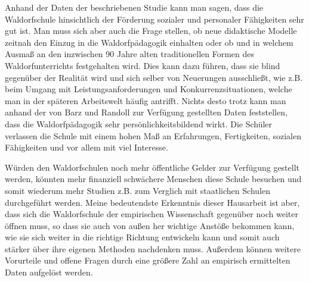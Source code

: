 Anhand der Daten der beschriebenen Studie kann man sagen, dass die Waldorfschule hinsichtlich der Förderung sozialer und personaler Fähigkeiten sehr gut ist. Man muss sich aber auch die Frage stellen, ob neue didaktische Modelle zeitnah den Einzug in die Waldorfpädagogik einhalten oder ob und in welchem Ausmaß an den inzwischen 90 Jahre alten traditionellen Formen des Waldorfunterrichts festgehalten wird. Dies kann dazu führen, dass sie blind gegenüber der Realität wird und sich selber von Neuerungen ausschließt, wie z.B. beim Umgang mit Leistungsanforderungen und Konkurrenzsituationen, welche man in der späteren Arbeitswelt häufig antrifft. Nichts desto trotz kann man anhand der von Barz und Randoll zur Verfügung gestellten Daten feststellen, dass die Waldorfpädagogik sehr persönlichkeitsbildend wirkt. Die Schüler verlassen die Schule mit einem hohen Maß an Erfahrungen, Fertigkeiten, sozialen Fähigkeiten und vor allem mit viel Interesse. 

Würden den Waldorfschulen noch mehr öffentliche Gelder zur Verfügung gestellt werden, könnten mehr finanziell schwächere Menschen diese Schule besuchen und somit wiederum mehr Studien z.B. zum Verglich mit staatlichen Schulen durchgeführt werden. Meine bedeutendste Erkenntnis dieser Hausarbeit ist aber, dass sich die Waldorfschule der empirischen Wissenschaft gegenüber noch weiter öffnen muss, so dass sie auch von außen her wichtige Anstöße bekommen kann, wie sie sich weiter in die richtige Richtung entwickeln kann und somit auch stärker über ihre eigenen Methoden nachdenken muss. Außerdem können weitere Vorurteile und offene Fragen durch eine größere Zahl an empirisch ermittelten Daten aufgelöst werden. 




